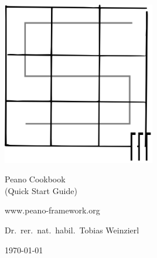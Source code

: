 
\begin{titlepage}

  \begin{center}

    \vspace{8cm}
  
    \includegraphics[width=0.5\textwidth]{logo.png}
 
    \vspace{1.5cm}

    {\Huge
      Peano Cookbook
    }
    \\
    (Quick Start Guide)
   
    \vspace{1cm}

     www.peano-framework.org
     
    \vspace{1.5cm}

     Dr.~rer.~nat.~habil.~Tobias Weinzierl
 
    \vspace{1.5cm}

    \today
  \end{center}


\end{titlepage}
